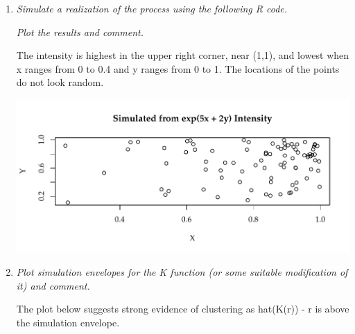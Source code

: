\documentclass{article}\usepackage[]{graphicx}\usepackage[]{color}
\makeatletter
\def\maxwidth{ %
  \ifdim\Gin@nat@width>\linewidth
    \linewidth
  \else
    \Gin@nat@width
  \fi
}
\newenvironment{knitrout}{}{} %
\makeatother
\begin{document}
\begin{enumerate}
\begin{enumerate}
\item %
{\it Simulate a realization of the process using the following R code.}


{\it Plot the results and comment.}

The intensity is highest in the upper right corner, near (1,1), and lowest when x ranges from 0 to 0.4 and y ranges from 0 to 1. The locations of the points do not look random.

\begin{knitrout}\footnotesize
{}\color{fgcolor}

{\centering \includegraphics[width=\maxwidth]{figure/prob2a-1} 

}



\end{knitrout}

\item %
{\it Plot simulation envelopes for the K function (or some suitable modification of it) and comment.}

The plot below suggests strong evidence of clustering as hat(K(r)) - r is above the simulation envelope.

\begin{knitrout}\footnotesize
{}\color{fgcolor}


\end{knitrout}
\end{enumerate}
\end{enumerate}
\end{document}
